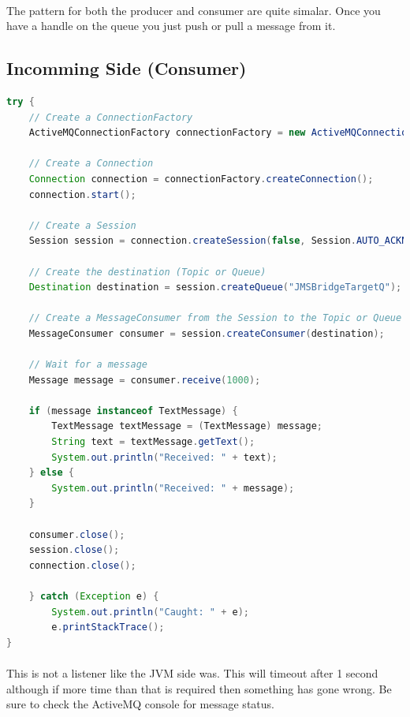 \documentclass[
10pt, %
letterpaper, %
oneside, %
headinclude,footinclude, %
BCOR5mm, %
]{scrartcl}
\begin{document}
\paragraph{}
The pattern for both the producer and consumer are quite simalar. Once you have a handle on the queue you just push or pull a message from it.

\subsection{\textbf{Incomming Side (Consumer)}}
\begin{lstlisting}[language=Java]
try {
	// Create a ConnectionFactory
	ActiveMQConnectionFactory connectionFactory = new ActiveMQConnectionFactory("tcp://opmq1.outsmartinc.com:61616");

	// Create a Connection
	Connection connection = connectionFactory.createConnection();
	connection.start();

	// Create a Session
	Session session = connection.createSession(false, Session.AUTO_ACKNOWLEDGE);

	// Create the destination (Topic or Queue)
	Destination destination = session.createQueue("JMSBridgeTargetQ");

	// Create a MessageConsumer from the Session to the Topic or Queue
	MessageConsumer consumer = session.createConsumer(destination);

	// Wait for a message
	Message message = consumer.receive(1000);

	if (message instanceof TextMessage) {
		TextMessage textMessage = (TextMessage) message;
		String text = textMessage.getText();
		System.out.println("Received: " + text);
	} else {
		System.out.println("Received: " + message);
	}

	consumer.close();	
	session.close();
	connection.close();
	
	} catch (Exception e) {
		System.out.println("Caught: " + e);
		e.printStackTrace();
}
\end{lstlisting}


\paragraph{}
This is not a listener like the JVM side was. This will timeout after 1 second although if more time than that is required then something has gone wrong. Be sure to check the ActiveMQ console for message status.
\end{document}
